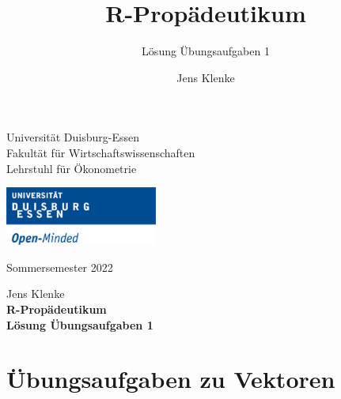 \documentclass[12pt,a4paper]{article}
\title{R-Propädeutikum}
\subtitle{Lösung Übungsaufgaben 1}
\author{Jens Klenke}
\date{}
\begin{document}





\restoregeometry



\begin{minipage}{0.6\textwidth}
Universität Duisburg-Essen\\
Fakultät für Wirtschaftswissenschaften\\
Lehrstuhl für Ökonometrie\\
\end{minipage}

	\begin{flushright}
	\vspace{-3cm}
	\includegraphics*[width=5cm]{includes/duelogo_en.png}\\
	\vspace{.125cm}
	\end{flushright}
\hspace{-0.005cm}Sommersemester 2022

\vspace{0.05cm}

\begin{center}
	\vspace{.25cm}
	Jens Klenke \hspace{.5cm}  \\
	\vspace{.25cm}
	\textbf{\Large{R-Propädeutikum}}\\
	\vspace{.25cm}
	\textbf{\large{Lösung Übungsaufgaben 1}}\\
	\vspace{.125cm}
\end{center}





\hypertarget{uxfcbungsaufgaben-zu-vektoren}{%
\section{Übungsaufgaben zu
Vektoren}\label{uxfcbungsaufgaben-zu-vektoren}}
\end{document}
